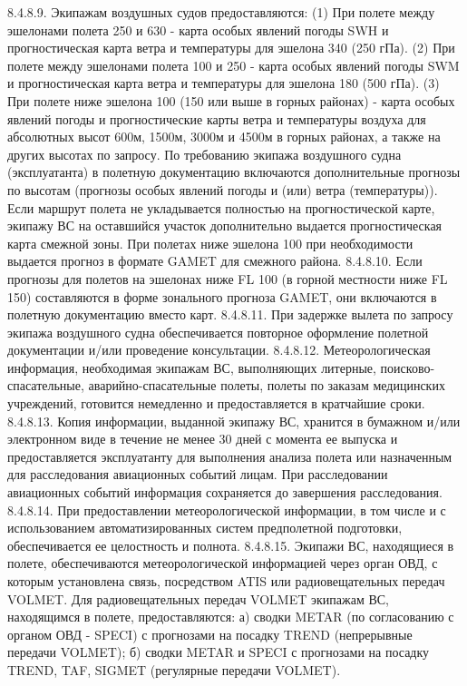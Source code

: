 8.4.8.9. Экипажам воздушных судов предоставляются: 
(1) При полете между эшелонами полета 250 и 630 - карта особых явлений погоды SWH и прогностическая карта ветра и температуры для эшелона 340 (250 гПа). 
(2) При полете между эшелонами полета 100 и 250 - карта особых явлений погоды SWM и прогностическая карта ветра и температуры для эшелона 180 (500 гПа).
(3) При полете ниже эшелона 100 (150 или выше в горных районах) - карта особых явлений погоды и прогностические карты ветра и температуры воздуха для абсолютных высот 600м, 1500м, 3000м и 4500м в горных районах, а также на других высотах по запросу.
По требованию экипажа воздушного судна (эксплуатанта) в полетную документацию включаются дополнительные прогнозы по высотам (прогнозы особых явлений погоды и (или) ветра (температуры)). 
Если маршрут полета не укладывается полностью на прогностической карте, экипажу ВС на оставшийся участок дополнительно выдается прогностическая карта смежной зоны. При полетах ниже эшелона 100 при необходимости выдается прогноз в формате GAMET для смежного района.
8.4.8.10. Если прогнозы для полетов на эшелонах ниже FL 100 (в горной местности ниже FL 150) составляются в форме зонального прогноза GAMET, они включаются в полетную документацию вместо карт. 
8.4.8.11. При задержке вылета по запросу экипажа воздушного судна обеспечивается повторное оформление полетной документации и/или проведение консультации. 
8.4.8.12. Метеорологическая информация, необходимая экипажам ВС, выполняющих литерные, поисково-спасательные, аварийно-спасательные полеты, полеты по заказам медицинских учреждений, готовится немедленно и предоставляется в кратчайшие сроки. 
8.4.8.13. Копия информации, выданной экипажу ВС, хранится в бумажном и/или электронном виде в течение не менее 30 дней с момента ее выпуска и предоставляется эксплуатанту для выполнения анализа полета или назначенным для расследования авиационных событий лицам. При расследовании авиационных событий информация сохраняется до завершения расследования. 
8.4.8.14. При предоставлении метеорологической информации, в том числе и с использованием автоматизированных систем предполетной подготовки, обеспечивается ее целостность и полнота. 
8.4.8.15. Экипажи ВС, находящиеся в полете, обеспечиваются метеорологической информацией через орган ОВД, с которым установлена связь, посредством ATIS или радиовещательных передач VOLMET. 
Для радиовещательных передач VOLMET экипажам ВС, находящимся в полете, предоставляются: 
а)	сводки METAR (по согласованию с органом ОВД - SPECI) с прогнозами на посадку TREND (непрерывные передачи VOLMET); 
б)	сводки METAR и SPECI с прогнозами на посадку TREND, TAF, SIGMET (регулярные передачи VOLMET). 
